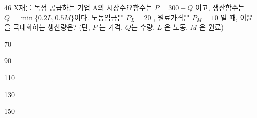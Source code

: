 \begin{question}{46}
X재를 독점 공급하는 기업 A의 시장수요함수는 $P=300-Q$ 이고, 생산함수는 $Q=\min\{0.2L,0.5M\}$이다. 노동임금은 $P_{L}=20$ , 원료가격은 $P_{M}=10$ 일 때, 이윤을 극대화하는 생산량은? (단, $P$ 는 가격, $Q$는 수량, $L$ 은 노동, $M$ 은 원료)
\begin{choices}
  \item 70
  \item 90
  \item 110
  \item 130
  \item 150
\end{choices}
\end{question}
